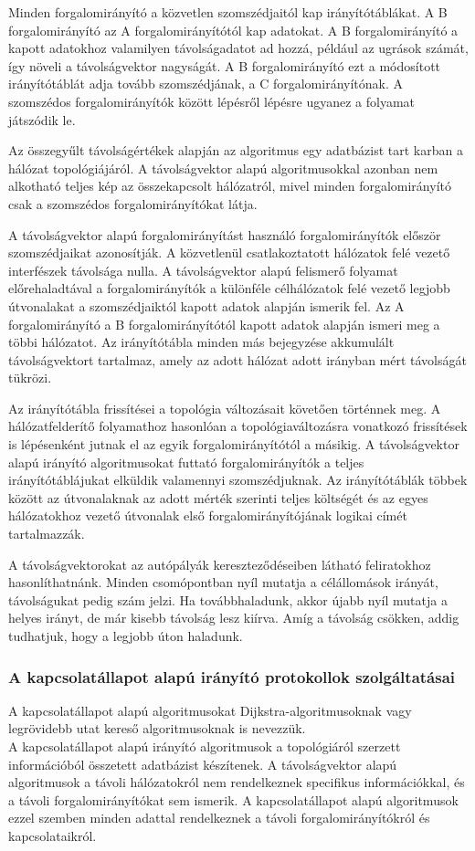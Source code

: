 Minden forgalomirányító a közvetlen szomszédjaitól kap irányítótáblákat. A B
forgalomirányító az A forgalomirányítótól kap adatokat. A B forgalomirányító a kapott
adatokhoz valamilyen távolságadatot ad hozzá, például az ugrások számát, így növeli a
távolságvektor nagyságát. A B forgalomirányító ezt a módosított irányítótáblát adja tovább
szomszédjának, a C forgalomirányítónak. A szomszédos forgalomirányítók között lépésről
lépésre ugyanez a folyamat játszódik le.

Az összegyűlt távolságértékek alapján az algoritmus egy adatbázist tart karban a hálózat
topológiájáról. A távolságvektor alapú algoritmusokkal azonban nem alkotható teljes kép az
összekapcsolt hálózatról, mivel minden forgalomirányító csak a szomszédos
forgalomirányítókat látja.

A távolságvektor alapú forgalomirányítást használó forgalomirányítók először szomszédjaikat
azonosítják. A közvetlenül csatlakoztatott hálózatok felé vezető interfészek távolsága nulla.
A távolságvektor alapú felismerő folyamat előrehaladtával a forgalomirányítók a különféle
célhálózatok felé vezető legjobb útvonalakat a szomszédjaiktól kapott adatok alapján ismerik
fel. Az A forgalomirányító a B forgalomirányítótól kapott adatok alapján ismeri meg a többi
hálózatot. Az irányítótábla minden más bejegyzése akkumulált távolságvektort tartalmaz,
amely az adott hálózat adott irányban mért távolságát tükrözi.

Az irányítótábla frissítései a topológia változásait követően történnek meg. A hálózatfelderítő
folyamathoz hasonlóan a topológiaváltozásra vonatkozó frissítések is lépésenként jutnak el az
egyik forgalomirányítótól a másikig. A távolságvektor alapú irányító algoritmusokat futtató
forgalomirányítók a teljes irányítótáblájukat elküldik valamennyi szomszédjuknak. Az
irányítótáblák többek között az útvonalaknak az adott mérték szerinti teljes költségét és az
egyes hálózatokhoz vezető útvonalak első forgalomirányítójának logikai címét tartalmazzák.

A távolságvektorokat az autópályák kereszteződéseiben látható feliratokhoz hasonlíthatnánk.
Minden csomópontban nyíl mutatja a célállomások irányát, távolságukat pedig szám jelzi. Ha
továbbhaladunk, akkor újabb nyíl mutatja a helyes irányt, de már kisebb távolság lesz kiírva.
Amíg a távolság csökken, addig tudhatjuk, hogy a legjobb úton haladunk.

\subsubsection{A kapcsolatállapot alapú irányító protokollok szolgáltatásai}
A kapcsolatállapot alapú algoritmusokat Dijkstra-algoritmusoknak vagy legrövidebb utat
kereső algoritmusoknak is nevezzük.\\
A kapcsolatállapot alapú irányító algoritmusok a topológiáról szerzett információból összetett
adatbázist készítenek. A távolságvektor alapú algoritmusok a távoli hálózatokról nem
rendelkeznek specifikus információkkal, és a távoli forgalomirányítókat sem ismerik. A kapcsolatállapot alapú algoritmusok ezzel szemben minden adattal rendelkeznek a távoli
forgalomirányítókról és kapcsolataikról.

